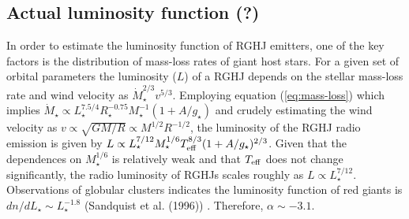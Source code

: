 \documentclass[12pt]{emulateapj}
\begin{document}
\subsection{Actual luminosity function (?)}

In order to estimate the luminosity function of RGHJ emitters, one of the key factors is the distribution of mass-loss rates of giant host stars. 
For a given set of orbital parameters the luminosity ($L$) of a RGHJ depends on the stellar mass-loss rate and wind velocity as $\dot{M}_\star^{2/3} v^{5/3}$. 
Employing equation (\ref{eq:mass-loss}) which implies $\dot{M}_\star \propto L_\star^{7.5/4} R_\star^{-0.75} M_\star^{-1} (1+A/g_\star)$ and crudely estimating the wind velocity as $v \propto \sqrt{GM/R} \propto M^{1/2} R^{-1/2}$, the luminosity of the RGHJ radio emission is given by $L \propto L_\star^{7/12} M_\star^{1/6} T_{\rm eff}^{8/3} (1+A/g_\star)^{2/3}$. 
Given that the dependences on $M_\star^{1/6}$ is relatively weak and that $T_{\rm eff}$ does not change significantly, the radio luminosity of RGHJs scales roughly as $L \propto L_{\star }^{7/12}$. 
Observations of globular clusters indicates the luminosity function of red giants is $dn/dL_{\star } \sim L_{\star }^{-1.8}$ (Sandquist et al. (1996)) %
. Therefore, $\alpha \sim -3.1$. 
\end{document}
